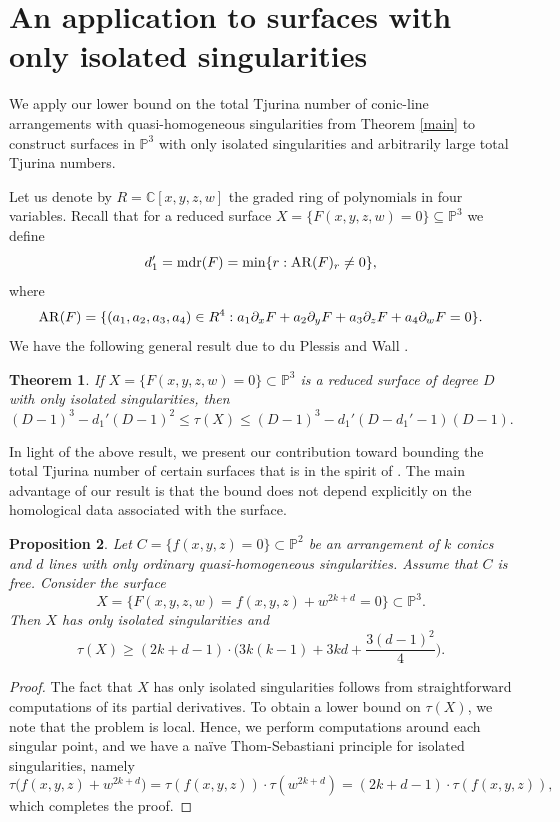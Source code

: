 \documentclass[11pt]{article}
\theoremstyle{plain}
\newtheorem{theorem}{Theorem}[section]
\newtheorem{proposition}[theorem]{Proposition}
\theoremstyle{definition}
\theoremstyle{remark}
\begin{document}
\section{An application to surfaces with only isolated singularities}
We apply our lower bound on the total Tjurina number of conic-line arrangements with quasi-homogeneous singularities from Theorem \ref{main} to construct surfaces in $\mathbb{P}^3$ with only isolated singularities and arbitrarily large total Tjurina numbers. 

Let us denote by $R = \mathbb{C}[x,y,z,w]$ the graded ring of polynomials in four variables. Recall that for a reduced surface $X = \{F(x,y,z,w)=0\} \subseteq \mathbb{P}^{3}$ we define
$$d_{1}' = {\rm mdr}(F) = {\rm min}\{r : {\rm AR}(F)_{r}\neq 0\},$$
where
$${\rm AR}(F) = \{ (a_{1},a_{2},a_{3},a_{4})\in R^{4} : a_{1}\partial_{x}F + a_{2}\partial_{y}F + a_{3}\partial_{z}F + a_{4}\partial_{w}F = 0\}.$$
We have the following general result due to du Plessis and Wall \cite[Theorem 5.4]{DPP2}.
\begin{theorem}
If $X = \{F(x,y,z,w)=0\}\subset\mathbb{P}^{3}$ is a reduced surface of degree $D$ with only isolated singularities, then
\[(D-1)^{3}-d_{1}'(D-1)^{2} \leq \tau(X) \leq (D-1)^{3}-d_{1}'(D-d_{1}'-1)(D-1).\]
\end{theorem}
In light of the above result, we present our contribution toward bounding the total Tjurina number of certain surfaces that is in the spirit of \cite[Remark 3.2]{DS26}. The main advantage of our result is that the bound does not depend explicitly on the homological data associated with the surface.
\begin{proposition}
\label{sur}
Let $C = \{f(x,y,z) =0\} \subset \mathbb{P}^{2}$ be an arrangement of $k$ conics and $d$ lines with only ordinary quasi-homogeneous singularities. Assume that $C$ is free. Consider the surface
$$X = \{F(x,y,z,w) = f(x,y,z)+w^{2k+d} = 0\} \subset \mathbb{P}^{3}.$$
Then $X$ has only isolated singularities and
$$\tau(X) \geq (2k+d-1)\cdot\bigg(3k(k-1) + 3kd + \frac{3(d-1)^2}{4}\bigg).$$
\end{proposition}
\begin{proof}
The fact that $X$ has only isolated singularities follows from straightforward computations of its partial derivatives. To obtain a lower bound on 
$\tau(X)$, we note that the problem is local. Hence, we perform computations around each singular point, and we have a na\"ive Thom-Sebastiani principle for isolated singularities, namely
$$\tau\bigg(f(x,y,z) + w^{2k+d}\bigg) = \tau(f(x,y,z))\cdot\tau(w^{2k+d})= (2k+d-1)\cdot\tau(f(x,y,z)),$$
which completes the proof.
\end{proof}
\end{document}
